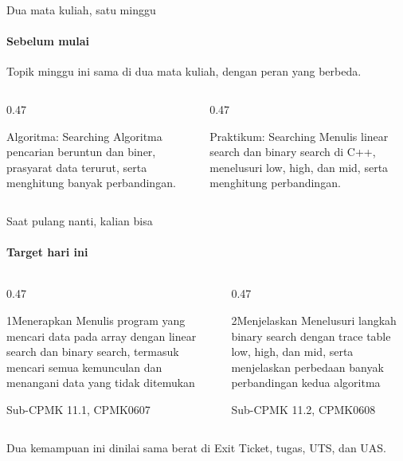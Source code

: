 \documentclass[t]{beamer}
\begin{document}

\begin{frame}{Dua mata kuliah, satu minggu}
\framesubtitle{Sebelum mulai}
Topik minggu ini sama di dua mata kuliah, dengan peran yang berbeda.
\vspace{10pt}

\begin{columns}[T]
\begin{column}{0.47\textwidth}
\begin{Blok}{Algoritma: Searching}
Algoritma pencarian beruntun dan biner, prasyarat data terurut, serta menghitung banyak perbandingan.
\end{Blok}
\end{column}
\begin{column}{0.47\textwidth}
\begin{BlokGelap}{Praktikum: Searching}
Menulis linear search dan binary search di C++, menelusuri low, high, dan mid, serta menghitung perbandingan.
\end{BlokGelap}
\end{column}
\end{columns}
\end{frame}

\begin{frame}{Saat pulang nanti, kalian bisa}
\framesubtitle{Target hari ini}
\begin{columns}[T]
\begin{column}{0.47\textwidth}
\begin{Langkah}{1}{Menerapkan}
Menulis program yang mencari data pada array dengan linear search dan binary search, termasuk mencari semua kemunculan dan menangani data yang tidak ditemukan

{\footnotesize\color{ITERAInkMuted}Sub-CPMK 11.1, CPMK0607}
\end{Langkah}
\end{column}
\begin{column}{0.47\textwidth}
\begin{Langkah}{2}{Menjelaskan}
Menelusuri langkah binary search dengan trace table low, high, dan mid, serta menjelaskan perbedaan banyak perbandingan kedua algoritma

{\footnotesize\color{ITERAInkMuted}Sub-CPMK 11.2, CPMK0608}
\end{Langkah}
\end{column}
\end{columns}
\vspace{8pt}
\begin{Catatan}
Dua kemampuan ini dinilai sama berat di Exit Ticket, tugas, UTS, dan UAS.
\end{Catatan}
\end{frame}
\end{document}
